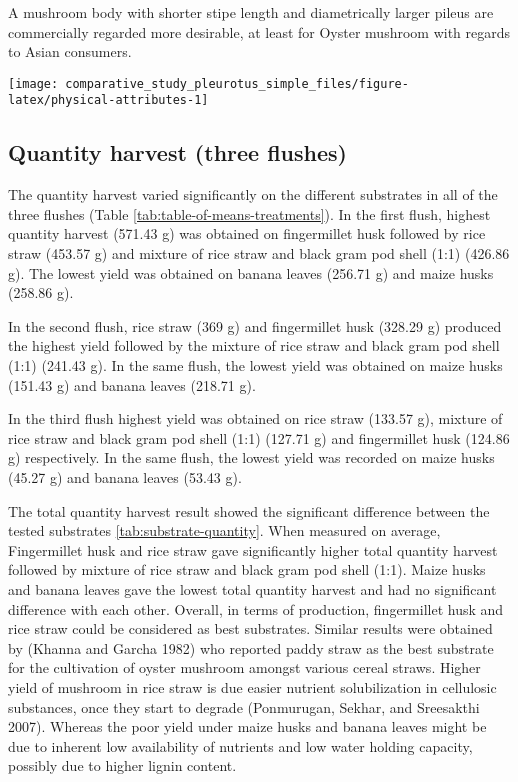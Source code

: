 \documentclass[]{article}
\begin{document}
A mushroom body with shorter stipe length and diametrically larger pileus are commercially regarded more desirable, at least for Oyster mushroom with regards to Asian consumers.

\begin{center}\texttt{[image: comparative\_study\_pleurotus\_simple\_files/figure-latex/physical-attributes-1]} \end{center}

\hypertarget{quantity-harvest-three-flushes}{%
\subsection{Quantity harvest (three flushes)}\label{quantity-harvest-three-flushes}}

The quantity harvest varied significantly on the different substrates in all of the three flushes (Table \ref{tab:table-of-means-treatments}). In the first flush, highest quantity harvest (571.43 g) was obtained on fingermillet husk followed by rice straw (453.57 g) and mixture of rice straw and black gram pod shell (1:1) (426.86 g). The lowest yield was obtained on banana leaves (256.71 g) and maize husks (258.86 g).

In the second flush, rice straw (369 g) and fingermillet husk (328.29 g) produced the highest yield followed by the mixture of rice straw and black gram pod shell (1:1) (241.43 g). In the same flush, the lowest yield was obtained on maize husks (151.43 g) and banana leaves (218.71 g).

In the third flush highest yield was obtained on rice straw (133.57 g), mixture of rice straw and black gram pod shell (1:1) (127.71 g) and fingermillet husk (124.86 g) respectively. In the same flush, the lowest yield was recorded on maize husks (45.27 g) and banana leaves (53.43 g).

The total quantity harvest result showed the significant difference between the tested substrates \ref{tab:substrate-quantity}. When measured on average, Fingermillet husk and rice straw gave significantly higher total quantity harvest followed by mixture of rice straw and black gram pod shell (1:1). Maize husks and banana leaves gave the lowest total quantity harvest and had no significant difference with each other. Overall, in terms of production, fingermillet husk and rice straw could be considered as best substrates. Similar results were obtained by (Khanna and Garcha 1982) who reported paddy straw as the best substrate for the cultivation of oyster mushroom amongst various cereal straws. Higher yield of mushroom in rice straw is due easier nutrient solubilization in cellulosic substances, once they start to degrade (Ponmurugan, Sekhar, and Sreesakthi 2007). Whereas the poor yield under maize husks and banana leaves might be due to inherent low availability of nutrients and low water holding capacity, possibly due to higher lignin content.
\end{document}
